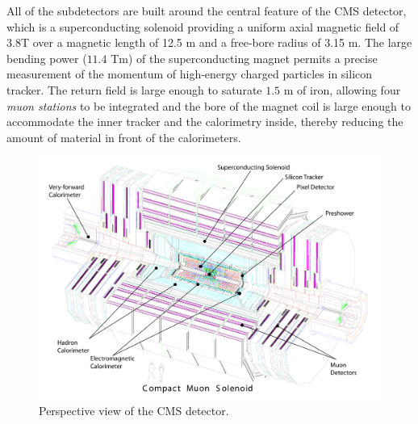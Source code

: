 All of the subdetectors are built around the central feature of the
CMS detector, which is a superconducting solenoid providing a uniform axial
magnetic field of 3.8\unit{T}  over a magnetic length of 12.5 \unit{m}
and a free-bore radius of 3.15 \unit{m}. The large bending power ($11.4$ \unit{T}\unit{m}) of the
superconducting magnet permits a precise measurement of the momentum
of high-energy charged particles in silicon tracker. The return field is large enough to
saturate $1.5$ \unit{m} of iron, allowing four \emph{muon stations} to be
integrated and the bore of the magnet coil is large enough to accommodate the inner tracker
and the calorimetry inside, thereby reducing the amount of material
in front of the calorimeters.


\begin{figure}\centering
\includegraphics[width=.9\textwidth]{figs/cms/Figure_001-002.pdf}
\caption{Perspective view of the CMS detector.\label{fig:CMSperspective}}
\end{figure}

